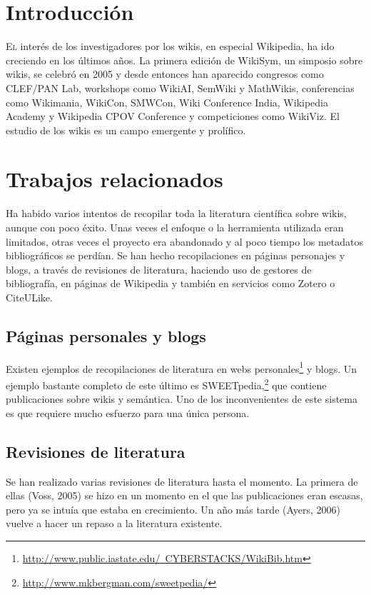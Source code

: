 \documentclass[twoside]{article}
\begin{document}
\begin{multicols}{2}
\section{Introducci\'{o}n}
\lettrine[nindent=0em,lines=3]{E} l inter\'{e}s de los investigadores por los wikis, en especial Wikipedia, ha ido creciendo en los \'{u}ltimos a\~{n}os. La primera edici\'{o}n de WikiSym, un simposio sobre wikis, se celebr\'{o} en 2005 y desde entonces han aparecido congresos como CLEF/PAN Lab, workshops como WikiAI, SemWiki y MathWikis, conferencias como Wikimania, WikiCon, SMWCon, Wiki Conference India, Wikipedia Academy y Wikipedia CPOV Conference y competiciones como WikiViz. El estudio de los wikis es un campo emergente y prol\'{i}fico.

\section{Trabajos relacionados}
Ha habido varios intentos de recopilar toda la literatura cient\'{i}fica sobre wikis, aunque con poco \'{e}xito. Unas veces el enfoque o la herramienta utilizada eran limitados, otras veces el proyecto era abandonado y al poco tiempo los metadatos bibliogr\'{a}ficos se perd\'{i}an. Se han hecho recopilaciones en p\'{a}ginas personajes y blogs, a trav\'{e}s de revisiones de literatura, haciendo uso de gestores de bibliograf\'{i}a, en p\'{a}ginas de Wikipedia y tambi\'{e}n en servicios como Zotero o CiteULike.

\subsection{P\'{a}ginas personales y blogs}
Existen ejemplos de recopilaciones de literatura en webs personales\footnote{\href{http://www.public.iastate.edu/~CYBERSTACKS/WikiBib.htm}{http://www.public.iastate.edu/~CYBERSTACKS/WikiBib.htm}} y blogs. Un ejemplo bastante completo de este \'{u}ltimo es SWEETpedia,\footnote{\href{http://www.mkbergman.com/sweetpedia/}{http://www.mkbergman.com/sweetpedia/}} que contiene publicaciones sobre wikis y sem\'{a}ntica. Uno de los inconvenientes de este sistema es que requiere mucho esfuerzo para una \'{u}nica persona.

\subsection{Revisiones de literatura}
Se han realizado varias revisiones de literatura hasta el momento. La primera de ellas (Voss, 2005) se hizo en un momento en el que las publicaciones eran escasas, pero ya se intu\'{i}a que estaba en crecimiento. Un a\~{n}o m\'{a}s tarde (Ayers, 2006) vuelve a hacer un repaso a la literatura existente.


\end{multicols}
\end{document}
